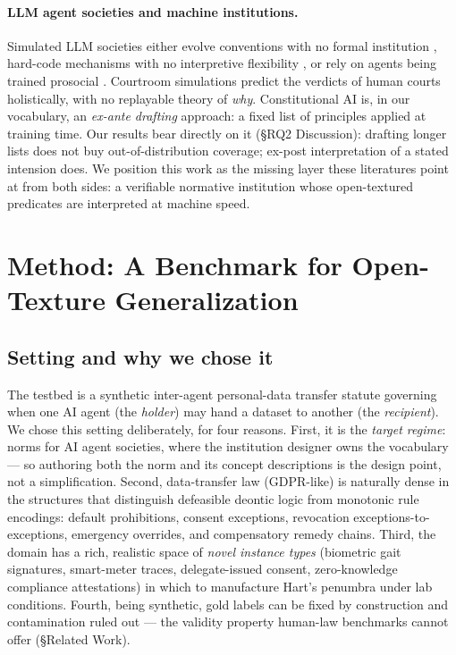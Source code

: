 \paragraph{LLM agent societies and machine institutions.}
Simulated LLM societies either evolve conventions with no formal institution
\citep{piatti2024govsim,ashery2025naming}, hard-code mechanisms with no
interpretive flexibility \citep{coopeval2025}, or rely on agents being
trained prosocial \citep{prosocial2026}. Courtroom simulations
\citep{agentcourt2024} predict the verdicts of human courts holistically,
with no replayable theory of \emph{why}. Constitutional AI
\citep{bai2022constitutional} is, in our vocabulary, an \emph{ex-ante
drafting} approach: a fixed list of principles applied at training time. Our
results bear directly on it (\S RQ2 Discussion): drafting longer lists does
not buy out-of-distribution coverage; ex-post interpretation of a stated
intension does. We position this work as the missing layer these literatures
point at from both sides: a verifiable normative institution whose
open-textured predicates are interpreted at machine speed.

\section{Method: A Benchmark for Open-Texture Generalization}

\subsection{Setting and why we chose it}

The testbed is a synthetic inter-agent personal-data transfer statute
governing when one AI agent (the \emph{holder}) may hand a dataset to another
(the \emph{recipient}). We chose this setting deliberately, for four reasons.
First, it is the \emph{target regime}: norms for AI agent societies, where the
institution designer owns the vocabulary --- so authoring both the norm and
its concept descriptions is the design point, not a simplification. Second,
data-transfer law (GDPR-like) is naturally dense in the structures that
distinguish defeasible deontic logic from monotonic rule encodings: default
prohibitions, consent exceptions, revocation exceptions-to-exceptions,
emergency overrides, and compensatory remedy chains. Third, the domain has a
rich, realistic space of \emph{novel instance types} (biometric gait
signatures, smart-meter traces, delegate-issued consent, zero-knowledge
compliance attestations) in which to manufacture Hart's penumbra under lab
conditions. Fourth, being synthetic, gold labels can be fixed by construction
and contamination ruled out --- the validity property human-law benchmarks
cannot offer (\S Related Work).

